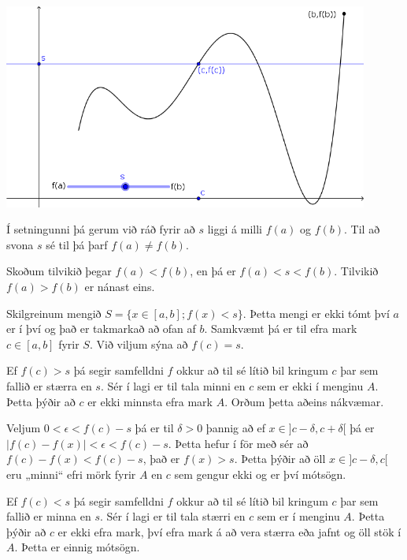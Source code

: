 \documentclass[a4paper,10pt,icelandic]{sphinxmanual}
\begin{document}
\begin{center}
\includegraphics[width=12cm,keepaspectratio=true]{10_milligildissetn.png}
\end{center}



Í setningunni þá gerum við ráð fyrir að \(s\) liggi á milli \(f(a)\) og
\(f(b)\). Til að svona \(s\) sé til þá þarf \(f(a) \neq f(b)\).

Skoðum tilvikið þegar \(f(a) < f(b)\), en þá er \(f(a) < s < f(b)\).
Tilvikið \(f(a)>f(b)\) er nánast eins.

Skilgreinum mengið \(S = \{ x \in [a,b] ; f(x) < s\}\). Þetta mengi er ekki tómt
því \(a\) er í því og það er takmarkað að ofan af \(b\). Samkvæmt
{\hyperref[\detokenize{kafli01:frumsendanumeframark}]{}} þá er til efra mark \(c \in[a,b]\)
fyrir \(S\). Við viljum sýna að \(f(c)=s\).

Ef \(f(c)>s\) þá segir samfelldni \(f\)
okkur að til sé lítið bil kringum \(c\) þar sem fallið er stærra en \(s\). Sér í lagi er
til tala minni en \(c\) sem er ekki í menginu \(A\). Þetta þýðir að \(c\) er
ekki minnsta efra mark \(A\). Orðum þetta aðeins nákvæmar.

Veljum \(0<\epsilon < f(c)-s\) þá er til \(\delta>0\) þannig að ef \(x\in ]c-\delta,c+\delta[\)
þá er \(|f(c)-f(x)|<\epsilon < f(c) -s\). Þetta hefur í för með sér að \(f(c) - f(x) < f(c) -s\),
það er \(f(x)>s\). Þetta þýðir að öll \(x\in]c-\delta,c[\) eru „minni“ efri mörk fyrir \(A\)
en \(c\) sem gengur ekki og er því mótsögn.

Ef \(f(c)<s\) þá segir samfelldni \(f\) okkur að til sé lítið bil kringum \(c\)
þar sem fallið er minna en \(s\). Sér í lagi  er til tala stærri en \(c\) sem er í menginu
\(A\). Þetta þýðir að \(c\) er ekki efra mark, því efra mark á að vera stærra eða jafnt
og öll stök í \(A\). Þetta er einnig mótsögn.
\end{document}
